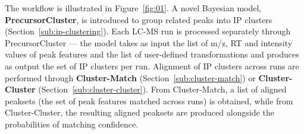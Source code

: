 The workflow is illustrated in Figure~\ref{fig:01}. A novel Bayesian model, \textbf{PrecursorCluster}, is introduced to group related peaks into IP clusters (Section~\ref{sub:ip-clustering}). Each LC-MS run is processed separately through PrecursorCluster --- the model takes as input the list of m/z, RT and intensity values of peak features and the list of user-defined transformations and produces as output the set of IP clusters per run. Alignment of IP clusters across runs are performed through \textbf{Cluster-Match} (Section~\ref{sub:cluster-match}) or \textbf{Cluster-Cluster} (Section~\ref{sub:cluster-cluster}). From Cluster-Match, a list of aligned peaksets (the set of peak features matched across runs) is obtained, while from Cluster-Cluster, the resulting aligned peaksets are produced alongside the probabilities of matching confidence.

